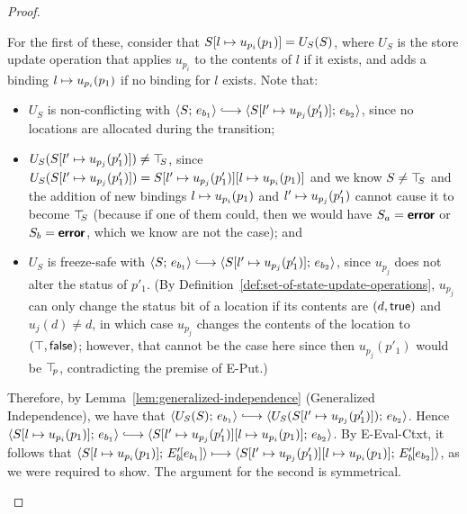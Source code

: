 \begin{proof}
\begin{enumerate}
\begin{enumerate}
\begin{itemize}
          For the first of these, consider that
          $S[l \mapsto u_{p_i}(p_1)] = U_S(S)$, where $U_S$ is the
          store update operation that applies $u_{p_i}$ to the
          contents of $l$ if it exists, and adds a binding
          $l \mapsto u_{p_i}(p_1)$ if no binding for $l$
          exists.  Note that:
          \begin{itemize}
          \item $U_S$ is non-conflicting with $\config{S}{e_{b_1}}
            \parstepsto
            \config{\extSRaw{S}{l'}{u_{p_j}(p'_1)}}{e_{b_2}}$, since
            no locations are allocated during the transition;
          \item $U_S(S[l' \mapsto u_{p_j}(p'_1)]) \neq \top\hspace{-0.85mm}_{S}$,
            since $U_S(S[l' \mapsto u_{p_j}(p'_1)]) =
            S[l' \mapsto u_{p_j}(p'_1)][l \mapsto u_{p_i}(p_1)]$
            and we know $S \neq \top\hspace{-0.85mm}_{S}$ and the addition of new
            bindings $l \mapsto u_{p_i}(p_1)$ and
            $l' \mapsto u_{p_j}(p'_1)$ cannot cause it to
            become $\top\hspace{-0.85mm}_{S}$ (because if one of them could, then we
            would have $S_a = \textbf{\textsf{error}}$ or $S_b = \textbf{\textsf{error}}$, which we know
            are not the case); and
          \item $U_S$ is freeze-safe with $\config{S}{e_{b_1}}
            \parstepsto
            \config{\extSRaw{S}{l'}{u_{p_j}(p'_1)}}{e_{b_2}}$, since
            $u_{p_j}$ does not alter the status of $p'_1$.  (By
            Definition~\ref{def:set-of-state-update-operations},
            $u_{p_j}$ can only change the status bit of a location if
            its contents are $(d, \textsf{true})$ and $u_j(d) \neq
            d$, in which case $u_{p_j}$ changes the contents of the
            location to $(\top, \textsf{false})$; however, that
            cannot be the case here since then $u_{p_j}(p'_1)$ would be
            $\top\hspace{-0.85mm}_{p}$, contradicting the premise of {\sc E-Put}.)
          \end{itemize}

          Therefore, by Lemma~\ref{lem:generalized-independence}
          (Generalized Independence), we have that
          $\config{U_S(S)}{e_{b_1}} \parstepsto
          \config{U_S(\extSRaw{S}{l'}{u_{p_j}(p'_1)})}{e_{b_2}}$.
          Hence $\config{\extSRaw{S}{l}{u_{p_i}(p_1)}}{e_{b_1}}
          \parstepsto
          \config{\extSRaw{\extSRaw{S}{l'}{u_{p_j}(p'_1)}}{l}{u_{p_i}(p_1)}}{e_{b_2}}$.
          By {\sc E-Eval-Ctxt}, it follows that
          $\langle S[l \mapsto u_{p_i}(p_1)];\, E'_b\hspace{-1mm}\left[e_{b_1}\right] \rangle
          \longmapsto
          \langle S[l' \mapsto u_{p_j}(p'_1)][l \mapsto u_{p_i}(p_1)];\, E'_b\hspace{-1mm}\left[e_{b_2}\right] \rangle$,
          as we were required to show.  The argument for the second is
          symmetrical.


\end{itemize}
\end{enumerate}
\end{enumerate}
\end{proof}
